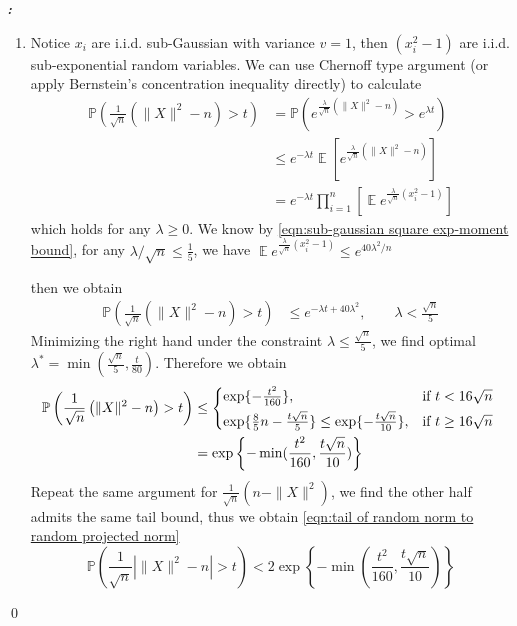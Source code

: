 \documentclass[12pt]{extarticle}
\renewenvironment{proof}[1][\proofname]{ { \it\bfseries #1: }}{\qed}
\newcommand{\field}[1]{\mathbb{#1}}
\newcommand{\1}{\field{1}}
\newcommand{\p}{\field{P}}
\DeclareMathOperator{\E}{\mathbb{E}}
\numberwithin{equation}{section}
\begin{document}
\begin{proof}

\begin{enumerate}

\item 
Notice $x_i$ are i.i.d. sub-Gaussian with variance $v=1$, then $ (x_i^2 -1)$ are  i.i.d. sub-exponential random variables. We can use Chernoff type argument (or apply Bernstein's  concentration inequality directly)  to calculate
\begin{align*}
    \p \left( \frac{1}{\sqrt{n}} \left(  \|X\|^2-n \right)> t \right) 
    & = \p \left( e^{\frac{\lambda}{\sqrt{n}} \left(  \|X\|^2 -n \right)} > e^{\lambda t} \right)  \\
    & \le e^{-\lambda t} \E \left[e^{\frac{\lambda}{\sqrt{n}} \left( \|X\|^2 -n \right)} \right] \\
    & =  e^{-\lambda t} \prod_{i=1}^n \left[ \E e^{\frac{\lambda}{\sqrt{n}} \left( x_i^2 -1 \right)} \right] 
\end{align*}
which holds for any $\lambda \ge 0$. We know by \cref{eqn:sub-gaussian square exp-moment bound}, for any $\lambda/\sqrt{n} \le \frac{1}{5}$, we have $\E e^{\frac{\lambda}{\sqrt{n}} \left( x_i^2-1 \right)} \le e^{ 40 \lambda^2/n  }$

then we obtain
\begin{align*}
    \p \left( \frac{1}{\sqrt{n}} \left( \|X\|^2-n \right)> t \right) 
    & \le  e^{-\lambda t + 40 \lambda^2} , \qquad   {\lambda} < \frac{{\sqrt{n}}}{5}
\end{align*}
Minimizing the right hand under the constraint  $\lambda \le \frac{\sqrt{n}}{5}$, we  find optimal $\lambda^*= \min(\frac{\sqrt{n}}{5}, \frac{t}{80})$.
Therefore we obtain
\begin{align}
    \p \left( \frac{1}{\sqrt{n}} \left(  \|X\|^2-n \right)> t \right) 
    & \le 
\begin{cases*}
\exp\{ {- \frac{t^2}{160} }  \},  & if $t < 16\sqrt{n}$  \\
\exp\{ { \frac{8}{5}n-\frac{t\sqrt{n}}{5} }  \} \le \exp\{ { -\frac{t\sqrt{n}}{10} } \},   & if $t\ge 16\sqrt{n}$
\end{cases*} \nonumber\\
& = \exp\left\{ {- \min(\frac{t^2}{160}, \frac{t\sqrt{n}}{10}) }  \right\}  \label{eqn:bounding one side tail of sum of squares of subgaussian}
\end{align}
Repeat the same argument for $\frac{1}{\sqrt{n}} \left( n- \|X\|^2 \right)$, we find the other half admits the same tail bound, thus we obtain \cref{eqn:tail of random norm to random projected norm} 
\begin{equation*}
    \p \left( \frac{1}{\sqrt{n}} \left| \|X\|^2-n \right|> t \right) < 2\exp\left\{ {- \min(\frac{t^2}{160}, \frac{t\sqrt{n}}{10}) }  \right\}
\end{equation*}



\end{enumerate}
\end{proof}
\end{document}
